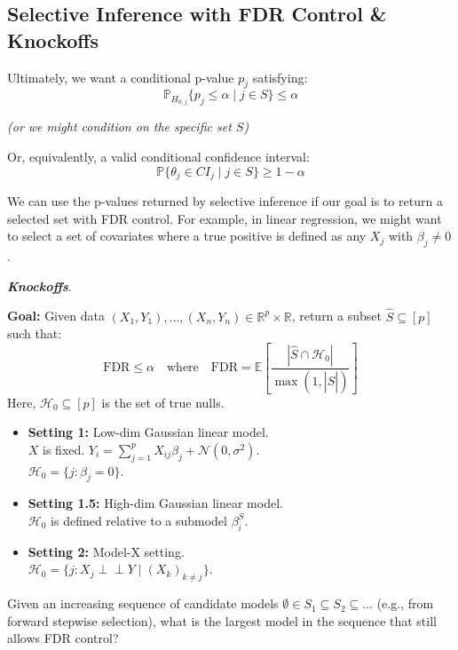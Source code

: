 \subsection{Selective Inference with FDR Control \& Knockoffs}
Ultimately, we want a conditional p-value $p_j$ satisfying:
\[ \mathbb{P}_{H_{0,j}} \{ p_j \le \alpha \mid j \in S \} \le \alpha \]
\begin{center}
    \textit{(or we might condition on the specific set $S$)}
\end{center}

\noindent Or, equivalently, a valid conditional confidence interval:
\[ \mathbb{P} \{ \theta_j \in CI_j \mid j \in S \} \ge 1 - \alpha \]

We can use the p-values returned by selective inference if our goal is to return a selected set with FDR control. For example, in linear regression, we might want to select a set of covariates where a true positive is defined as any $X_j$ with $\beta_j \neq 0$.

\emph{\textbf{Knockoffs}}.

\textbf{Goal:} Given data $(X_1, Y_1), \dots, (X_n, Y_n) \in \mathbb{R}^p \times \mathbb{R}$, return a subset $\hat{S} \subseteq [p]$ such that:
\[ \text{FDR} \le \alpha \quad \text{where} \quad \text{FDR} = \mathbb{E} \left[ \frac{|\hat{S} \cap \mathcal{H}_0|}{\max(1, |\hat{S}|)} \right] \]
Here, $\mathcal{H}_0 \subseteq [p]$ is the set of true nulls.

\begin{itemize}
    \item \textbf{Setting 1:} Low-dim Gaussian linear model.\\
    $X$ is fixed. $Y_i = \sum_{j=1}^p X_{ij}\beta_j + \mathcal{N}(0, \sigma^2)$. \\
    $\mathcal{H}_0 = \{j : \beta_j = 0\}$.
    
    \item \textbf{Setting 1.5:} High-dim Gaussian linear model. \\
    $\mathcal{H}_0$ is defined relative to a submodel $\beta_i^S$.
    
    \item \textbf{Setting 2:} Model-X setting. \\
    $\mathcal{H}_0 = \{j : X_j \perp\!\!\!\perp Y \mid (X_k)_{k \neq j} \}$.
\end{itemize}

Given an increasing sequence of candidate models $\emptyset \in S_1 \subseteq S_2 \subseteq \dots$ (e.g., from forward stepwise selection), what is the largest model in the sequence that still allows FDR control?

